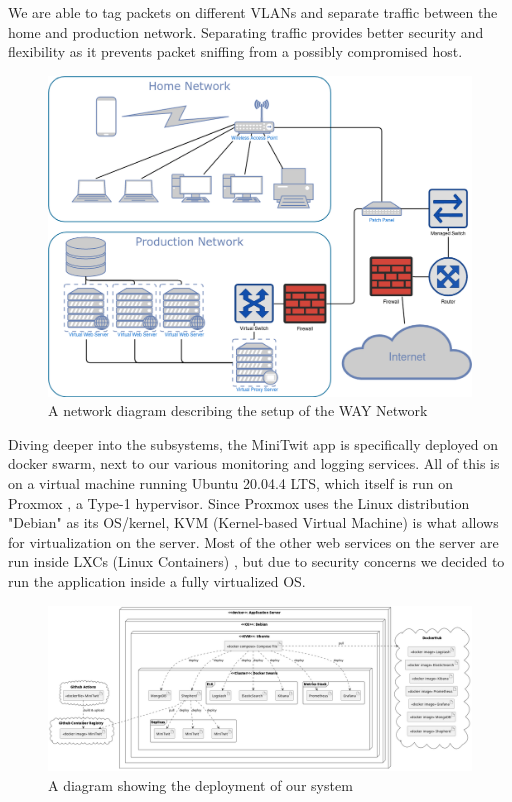 \documentclass{article}
\begin{document}
We are able to tag packets on different VLANs and separate traffic between the home and production network. Separating traffic provides better security and flexibility as it prevents packet sniffing from a possibly compromised host.

\begin{figure}[H]
    \centering
    \centerline{\includegraphics[scale=0.32]{WayNetwork.png}}
    \caption{A network diagram describing the setup of the WAY Network}
\end{figure}

Diving deeper into the subsystems, the MiniTwit app is specifically deployed on docker swarm, next to our various monitoring and logging services. All of this is on a virtual machine running Ubuntu 20.04.4 LTS, which itself is run on Proxmox \cite{proxmox}, a Type-1 hypervisor. Since Proxmox uses the Linux distribution "Debian" as its OS/kernel, KVM (Kernel-based Virtual Machine)\cite{kvm} is what allows for virtualization on the server. Most of the other web services on the server are run inside LXCs (Linux Containers) \cite{lxc}, but due to security concerns we decided to run the application inside a fully virtualized OS. 

\begin{figure}[H]
    \centering
    \centerline{\includegraphics[scale=0.3]{deploy_diagram.png}}
    \caption{A diagram showing the deployment of our system}
\end{figure}
\end{document}
